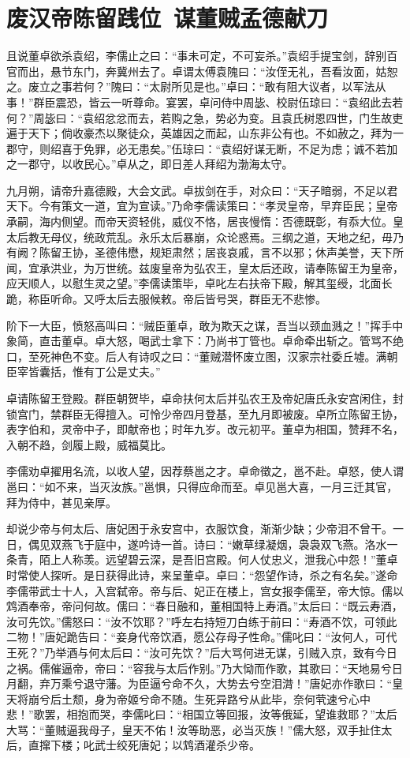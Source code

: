 \chapter{废汉帝陈留践位~谋董贼孟德献刀}

且说董卓欲杀袁绍，李儒止之曰：“事未可定，不可妄杀。”袁绍手提宝剑，辞别百官而出，悬节东门，奔冀州去了。卓谓太傅袁隗曰：“汝侄无礼，吾看汝面，姑恕之。废立之事若何？”隗曰：“太尉所见是也。”卓曰：“敢有阻大议者，以军法从事！”群臣震恐，皆云一听尊命。宴罢，卓问侍中周毖、校尉伍琼曰：“袁绍此去若何？”周毖曰：“袁绍忿忿而去，若购之急，势必为变。且袁氏树恩四世，门生故吏遍于天下；倘收豪杰以聚徒众，英雄因之而起，山东非公有也。不如赦之，拜为一郡守，则绍喜于免罪，必无患矣。”伍琼曰：“袁绍好谋无断，不足为虑；诚不若加之一郡守，以收民心。”卓从之，即日差人拜绍为渤海太守。

九月朔，请帝升嘉德殿，大会文武。卓拔剑在手，对众曰：“天子暗弱，不足以君天下。今有策文一道，宜为宣读。”乃命李儒读策曰：“孝灵皇帝，早弃臣民；皇帝承嗣，海内侧望。而帝天资轻佻，威仪不恪，居丧慢惰：否德既彰，有忝大位。皇太后教无母仪，统政荒乱。永乐太后暴崩，众论惑焉。三纲之道，天地之纪，毋乃有阙？陈留王协，圣德伟懋，规矩肃然；居丧哀戚，言不以邪；休声美誉，天下所闻，宜承洪业，为万世统。兹废皇帝为弘农王，皇太后还政，请奉陈留王为皇帝，应天顺人，以慰生灵之望。”李儒读策毕，卓叱左右扶帝下殿，解其玺绶，北面长跪，称臣听命。又呼太后去服候敕。帝后皆号哭，群臣无不悲惨。

阶下一大臣，愤怒高叫曰：“贼臣董卓，敢为欺天之谋，吾当以颈血溅之！”挥手中象简，直击董卓。卓大怒，喝武士拿下：乃尚书丁管也。卓命牵出斩之。管骂不绝口，至死神色不变。后人有诗叹之曰：“董贼潜怀废立图，汉家宗社委丘墟。满朝臣宰皆囊括，惟有丁公是丈夫。”

卓请陈留王登殿。群臣朝贺毕，卓命扶何太后并弘农王及帝妃唐氏永安宫闲住，封锁宫门，禁群臣无得擅入。可怜少帝四月登基，至九月即被废。卓所立陈留王协，表字伯和，灵帝中子，即献帝也；时年九岁。改元初平。董卓为相国，赞拜不名，入朝不趋，剑履上殿，威福莫比。

李儒劝卓擢用名流，以收人望，因荐蔡邕之才。卓命徵之，邕不赴。卓怒，使人谓邕曰：“如不来，当灭汝族。”邕惧，只得应命而至。卓见邕大喜，一月三迁其官，拜为侍中，甚见亲厚。

却说少帝与何太后、唐妃困于永安宫中，衣服饮食，渐渐少缺；少帝泪不曾干。一日，偶见双燕飞于庭中，遂吟诗一首。诗曰：“嫩草绿凝烟，袅袅双飞燕。洛水一条青，陌上人称羡。远望碧云深，是吾旧宫殿。何人仗忠义，泄我心中怨！”董卓时常使人探听。是日获得此诗，来呈董卓。卓曰：“怨望作诗，杀之有名矣。”遂命李儒带武士十人，入宫弑帝。帝与后、妃正在楼上，宫女报李儒至，帝大惊。儒以鸩酒奉帝，帝问何故。儒曰：“春日融和，董相国特上寿酒。”太后曰：“既云寿酒，汝可先饮。”儒怒曰：“汝不饮耶？”呼左右持短刀白练于前曰：“寿酒不饮，可领此二物！”唐妃跪告曰：“妾身代帝饮酒，愿公存母子性命。”儒叱曰：“汝何人，可代王死？”乃举酒与何太后曰：“汝可先饮？”后大骂何进无谋，引贼入京，致有今日之祸。儒催逼帝，帝曰：“容我与太后作别。”乃大恸而作歌，其歌曰：“天地易兮日月翻，弃万乘兮退守藩。为臣逼兮命不久，大势去兮空泪潸！”唐妃亦作歌曰：“皇天将崩兮后土颓，身为帝姬兮命不随。生死异路兮从此毕，奈何茕速兮心中悲！”歌罢，相抱而哭，李儒叱曰：“相国立等回报，汝等俄延，望谁救耶？”太后大骂：“董贼逼我母子，皇天不佑！汝等助恶，必当灭族！”儒大怒，双手扯住太后，直撺下楼；叱武士绞死唐妃；以鸩酒灌杀少帝。

